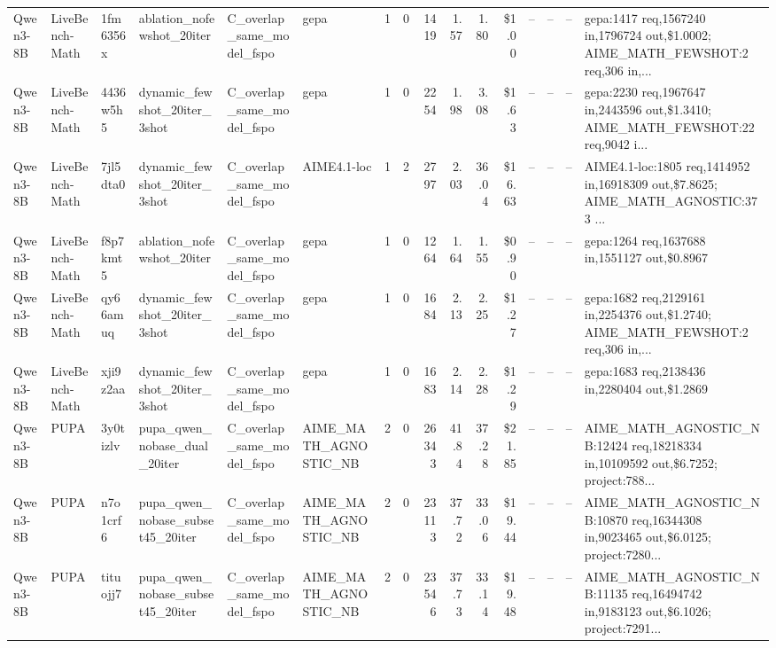 \begin{landscape}
\begin{table}[htbp]
{\begin{tabular}{@{}llllllllrrrrrlll@{}}
Qwen3-8B & LiveBench-Math & 1fm6356x & ablation\_nofewshot\_20iter & C\_overlap\_same\_model\_fspo & gepa & 1 & 0 & 1419 & 1.57 & 1.80 & \$1.00 & -- & -- & -- & gepa:1417 req,1567240 in,1796724 out,\$1.0002; AIME\_MATH\_FEWSHOT:2 req,306 in,... \\
Qwen3-8B & LiveBench-Math & 4436w5h5 & dynamic\_fewshot\_20iter\_3shot & C\_overlap\_same\_model\_fspo & gepa & 1 & 0 & 2254 & 1.98 & 3.08 & \$1.63 & -- & -- & -- & gepa:2230 req,1967647 in,2443596 out,\$1.3410; AIME\_MATH\_FEWSHOT:22 req,9042 i... \\
Qwen3-8B & LiveBench-Math & 7jl5dta0 & dynamic\_fewshot\_20iter\_3shot & C\_overlap\_same\_model\_fspo & AIME4.1-loc & 1 & 2 & 2797 & 2.03 & 36.04 & \$16.63 & -- & -- & -- & AIME4.1-loc:1805 req,1414952 in,16918309 out,\$7.8625; AIME\_MATH\_AGNOSTIC:373 ... \\
Qwen3-8B & LiveBench-Math & f8p7kmt5 & ablation\_nofewshot\_20iter & C\_overlap\_same\_model\_fspo & gepa & 1 & 0 & 1264 & 1.64 & 1.55 & \$0.90 & -- & -- & -- & gepa:1264 req,1637688 in,1551127 out,\$0.8967 \\
Qwen3-8B & LiveBench-Math & qy66amuq & dynamic\_fewshot\_20iter\_3shot & C\_overlap\_same\_model\_fspo & gepa & 1 & 0 & 1684 & 2.13 & 2.25 & \$1.27 & -- & -- & -- & gepa:1682 req,2129161 in,2254376 out,\$1.2740; AIME\_MATH\_FEWSHOT:2 req,306 in,... \\
Qwen3-8B & LiveBench-Math & xji9z2aa & dynamic\_fewshot\_20iter\_3shot & C\_overlap\_same\_model\_fspo & gepa & 1 & 0 & 1683 & 2.14 & 2.28 & \$1.29 & -- & -- & -- & gepa:1683 req,2138436 in,2280404 out,\$1.2869 \\
Qwen3-8B & PUPA & 3y0tizlv & pupa\_qwen\_nobase\_dual\_20iter & C\_overlap\_same\_model\_fspo & AIME\_MATH\_AGNOSTIC\_NB & 2 & 0 & 26343 & 41.84 & 37.28 & \$21.85 & -- & -- & -- & AIME\_MATH\_AGNOSTIC\_NB:12424 req,18218334 in,10109592 out,\$6.7252; project:788... \\
Qwen3-8B & PUPA & n7o1crf6 & pupa\_qwen\_nobase\_subset45\_20iter & C\_overlap\_same\_model\_fspo & AIME\_MATH\_AGNOSTIC\_NB & 2 & 0 & 23113 & 37.72 & 33.06 & \$19.44 & -- & -- & -- & AIME\_MATH\_AGNOSTIC\_NB:10870 req,16344308 in,9023465 out,\$6.0125; project:7280... \\
Qwen3-8B & PUPA & tituojj7 & pupa\_qwen\_nobase\_subset45\_20iter & C\_overlap\_same\_model\_fspo & AIME\_MATH\_AGNOSTIC\_NB & 2 & 0 & 23546 & 37.73 & 33.14 & \$19.48 & -- & -- & -- & AIME\_MATH\_AGNOSTIC\_NB:11135 req,16494742 in,9183123 out,\$6.1026; project:7291... \\
\bottomrule
\end{tabular}%
}
\end{table}
\end{landscape}
